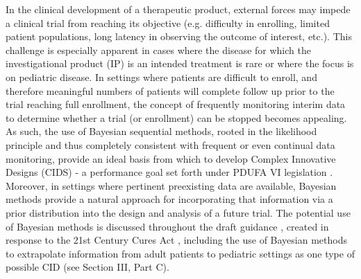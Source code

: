 \documentclass[AMA,STIX1COL,doublespace]{WileyNJD-v2}
\begin{document}
In the clinical development of a therapeutic product, external forces may impede a clinical trial from reaching its objective (e.g. difficulty in enrolling, limited patient populations, long latency in observing the outcome of interest, etc.). 
%
This challenge is especially apparent in cases where the disease for which the investigational product (IP) is an intended treatment is rare or where the focus is on pediatric disease. 
%
In settings where patients are difficult to enroll, and therefore meaningful numbers of patients will complete follow up prior to the trial reaching full enrollment, the concept of frequently monitoring interim data to determine whether a trial (or enrollment) can be stopped becomes appealing. 
%
As such, the use of Bayesian sequential methods, rooted in the likelihood principle and thus completely consistent with frequent or even continual data monitoring, provide an ideal basis from which to develop Complex Innovative Designs (CIDS) - a performance goal set forth under PDUFA VI legislation \citep{FDA2017}.
%
Moreover, in settings where pertinent preexisting data are available, Bayesian methods provide a natural approach for incorporating that information via a prior distribution into the design and analysis of a future trial.
%
The potential use of Bayesian methods is discussed throughout the draft guidance \citep{FDA_CID}, created in response to the 21st Century Cures Act \citep{USCongress2016}, including the use of Bayesian methods to extrapolate information from adult patients to pediatric settings as one type of possible CID (see Section III, Part C).
\end{document}
